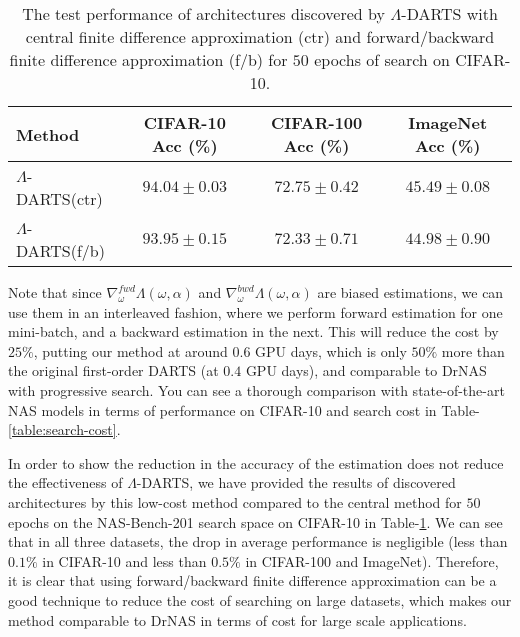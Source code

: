 \documentclass{article} \usepackage{fancyhdr, iclr2023_conference, times}
\newcommand{\mydarts}{$\Lambda$-DARTS\xspace}
\begin{document}
\begin{table}[t!]
\centering
\caption{The test performance of architectures discovered by \mydarts with central finite difference approximation (ctr) and forward/backward finite difference approximation (f/b) for $50$ epochs of search on CIFAR-10.} 
\label{table:lambda-darts-est}
\begin{tabular}{l|c|c|c}
\textbf{Method} & \textbf{CIFAR-10 Acc (\%)} & \textbf{CIFAR-100 Acc (\%)} & \textbf{ImageNet Acc (\%)}\\ \hline
    \mydarts (ctr) & $94.04\pm 0.03$ & $72.75\pm 0.42$ & $45.49\pm 0.08$ \\
    \mydarts (f/b) & $93.95\pm 0.15$ & $72.33\pm 0.71$ & $44.98\pm 0.90$
\end{tabular}
\end{table}Note that since $\nabla_\omega^{fwd} \Lambda(\omega, \alpha)$ and $\nabla_\omega^{bwd} \Lambda(\omega, \alpha)$ are biased estimations, we can use them in an interleaved fashion, where we perform forward estimation for one mini-batch, and a backward estimation in the next. This will reduce the cost by $25\%$, putting our method at around $0.6$ GPU days, which is only $50\%$ more than the original first-order DARTS (at $0.4$ GPU days), and comparable to DrNAS with progressive search. You can see a thorough comparison with state-of-the-art NAS models in terms of performance on CIFAR-10 and search cost in Table-\ref{table:search-cost}.
\par In order to show the reduction in the accuracy of the estimation does not reduce the effectiveness of \mydarts, we have provided the results of discovered architectures by this low-cost method compared to the central method for $50$ epochs on the NAS-Bench-201 search space on CIFAR-10 in Table-\ref{table:lambda-darts-est}. We can see that in all three datasets, the drop in average performance is negligible (less than $0.1\%$ in CIFAR-10 and less than $0.5\%$ in CIFAR-100 and ImageNet). Therefore, it is clear that using forward/backward finite difference approximation can be a good technique to reduce the cost of searching on large datasets, which makes our method comparable to DrNAS in terms of cost for large scale applications.
\end{document}
